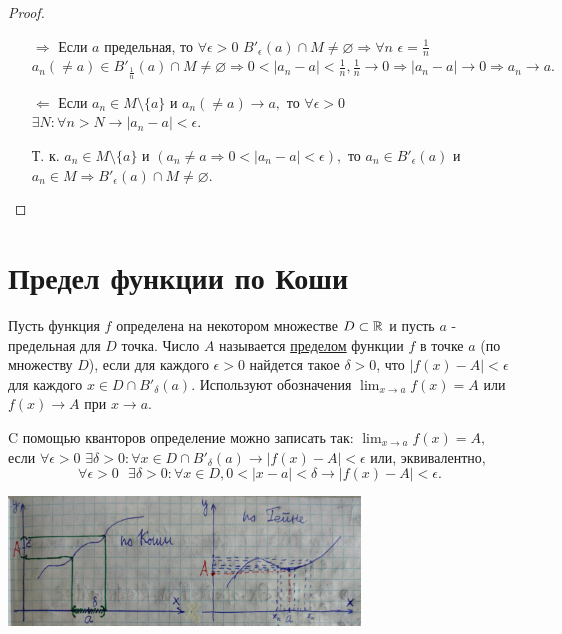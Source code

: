 	\begin{proof}
		\begin{itemize}
			\item[$\Rightarrow$] Если $a$ предельная, то $\forall \epsilon > 0$ $B'_{\epsilon}(a) \cap M \neq \varnothing \Rightarrow \forall n$ $\epsilon = \frac{1}{n}$ $a_n (\neq a) \in B'_{\frac{1}{n}}(a) \cap M \neq \varnothing \Rightarrow 0 < |a_n - a| < \frac{1}{n}, \frac{1}{n} \to 0 \Rightarrow |a_n - a| \to 0 \Rightarrow a_n \to a.$
			\item[$\Leftarrow$] Если $a_n \in M \setminus \{a\}$ и $a_n (\neq a) \to a,$ то $\forall \epsilon > 0$ $\exists N: \forall n > N \rightarrow |a_n - a| < \epsilon$. 
			
			Т. к. $a_n \in M \setminus \{a\}$ и $(a_n \neq a \Rightarrow 0 < |a_n - a| < \epsilon),$ то $a_n \in B'_{\epsilon}(a)$ и $a_n \in M \Rightarrow B'_{\epsilon}(a) \cap M \neq \varnothing.$
		\end{itemize}
	\end{proof}
	
	\section{Предел функции по Коши}
	
	\begin{theorem}
		Пусть функция $f$ определена на некотором множестве $D \subset \mathbb R$ и пусть $a$ - предельная для $D$ точка. Число $A$ называется \underline{пределом} функции $f$ в точке $a$ (по множеству $D$), если для каждого $\epsilon > 0$ найдется такое $\delta > 0$, что $|f(x) - A| < \epsilon$ для каждого $x \in D \cap B'_{\delta}(a)$. Используют обозначения $\lim_{x \to a} f(x) = A$ или $f(x) \to A$ при $x \to a$.
	\end{theorem}
	
	C помощью кванторов определение можно записать так: $\lim_{x \to a} f(x) = A,$  если $\forall \epsilon > 0$ $\exists \delta > 0: \forall x \in D \cap B'_{\delta}(a) \to |f(x) - A| < \epsilon$ или, эквивалентно,
	\[ \forall \epsilon > 0 \text{ } \exists \delta > 0: \forall x \in D, 0 < |x - a| < \delta \rightarrow |f(x) - A| < \epsilon. \]
	
	\begin{center}
		\includegraphics[width=0.7\textwidth]{img/lecture9/graphs}
	\end{center}
	
